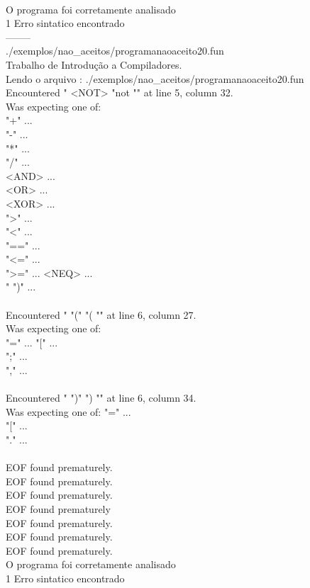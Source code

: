 \documentclass[
	article,			%
	11pt,				%
	oneside,			%
	a4paper,			%
	portuguese,			%
	brazil,				%
	sumario=tradicional
	]{abntex2}
\begin{document}
\\
O programa foi corretamente analisado\\
1 Erro sintatico encontrado\\
--------\\
./exemplos/nao\_aceitos/programanaoaceito20.fun\\
Trabalho de Introdução a Compiladores.\\
Lendo o arquivo : ./exemplos/nao\_aceitos/programanaoaceito20.fun\\
Encountered " <NOT> "not "" at line 5, column 32.\\
Was expecting one of:\\
    "+" ...\\
    "-" ...\\
    "*" ...\\
    "/" ...\\
    <AND> ...\\
    <OR> ...\\
    <XOR> ...\\
    ">" ...\\
    "<" ...\\
    "==" ...\\
    "<=" ...\\
    ">=" ...
    <NEQ> ...\\
    "%
    ")" ...\\
\\
Encountered " "(" "( "" at line 6, column 27.\\
Was expecting one of:\\
    "=" ...
    "[" ...\\
    ";" ...\\
    "," ...\\
\\
Encountered " ")" ") "" at line 6, column 34.\\
Was expecting one of:
    "=" ...\\
    "[" ...\\
    "." ...\\
\\
EOF found prematurely.\\
EOF found prematurely.\\
EOF found prematurely.\\
EOF found prematurely\\
EOF found prematurely.\\
EOF found prematurely.\\
EOF found prematurely.\\
O programa foi corretamente analisado\\
1 Erro sintatico encontrado\\
\end{document}
